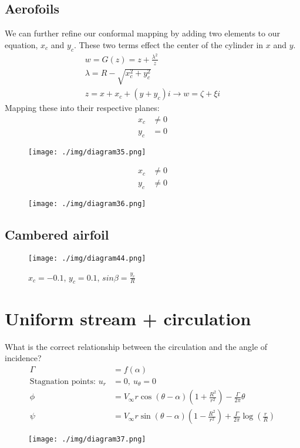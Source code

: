 \subsection{Aerofoils}
We can further refine our conformal mapping by adding two elements to our equation, $x_c$ and $y_c$. These two terms effect the center of the cylinder in $x$ and $y$.
\begin{gather}
  w = G(z) = z + \frac{\lambda^2}{z}\\
  \lambda = R - \sqrt{x_c^2 + y_c^2}\\
  z = x + x_c + (y + y_c)i \rightarrow w = \zeta + \xi i
\end{gather}
Mapping these into their respective planes:
\begin{align}
  x_c & \neq 0 \\
  y_c & = 0
\end{align}
\begin{figure}[H]
  \centering
  \texttt{[image: ./img/diagram35.png]}
\end{figure}
\begin{align}
  x_c & \neq 0 \\
  y_c & \neq 0
\end{align}
\begin{figure}[H]
  \centering
  \texttt{[image: ./img/diagram36.png]}
\end{figure}
\subsection{Cambered airfoil}
\begin{figure}[H]
  \centering
  \texttt{[image: ./img/diagram44.png]}
  \caption{$x_c = -0.1$, $y_c = 0.1$, $sin{\beta} = \frac{y_c}{R}$}
\end{figure}
\section{Uniform stream + circulation}
What is the correct relationship between the circulation and the angle of incidence?
\begin{align}
  \Gamma                           & = f(\alpha)                                                                                                               \\
  \textrm{Stagnation points: } u_r & = 0, \ u_\theta = 0                                                                                                       \\
  \phi                             & = V_\infty r \cos{(\theta - \alpha)}\left(1 + \frac{R^2}{r^2}\right) - \frac{\Gamma}{2\pi}\theta                          \\
  \psi                             & = V_\infty r \sin{(\theta - \alpha)}\left(1 - \frac{R^2}{r^2}\right) + \frac{\Gamma}{2\pi} \log{\left(\frac{r}{R}\right)}
\end{align}
\begin{figure}[H]
  \centering
  \texttt{[image: ./img/diagram37.png]}
\end{figure}
